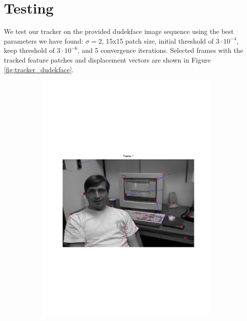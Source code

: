 \documentclass[11pt,a4paper]{article}
\begin{document}
\section{Testing}
%
We test our tracker on the provided dudekface image sequence using the best parameters we have found: $\sigma = 2$, 15x15 patch size, initial threshold of $3 \cdot 10^{-4}$, keep threshold of $3 \cdot 10^{-6}$, and 5 convergence iterations. Selected frames with the tracked feature patches and displacement vectors are shown in Figure \ref{fig:tracker_dudekface}.

\begin{figure}
\centering
\begin{subfigure}{0.45\textwidth}
\includegraphics[scale=0.4,trim={120 250 0 250}]{img/tracker_dudekface_1.pdf}
\end{subfigure}
\begin{subfigure}{0.45\textwidth}

\end{subfigure}
\end{figure}
\end{document}
